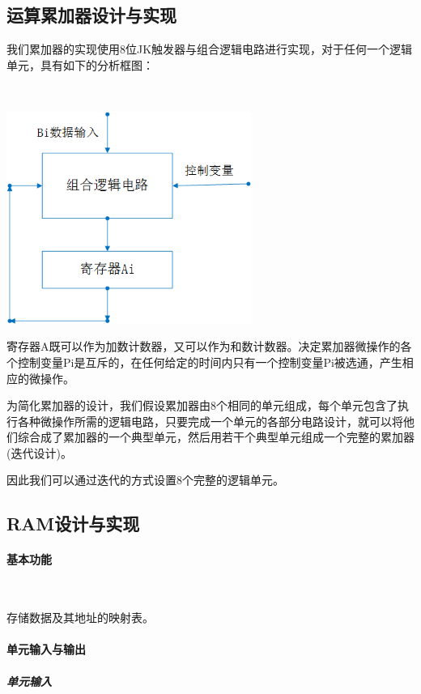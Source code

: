 \documentclass[UTF8]{ctexart}
\begin{document}
    \subsection{运算累加器设计与实现}
    我们累加器的实现使用8位JK触发器与组合逻辑电路进行实现，对于任何一个逻辑单元，具有如下的分析框图：

    ~

    \includegraphics[width=0.6\textwidth]{../img/累加器基本结构.png}

    寄存器A既可以作为加数计数器，又可以作为和数计数器。决定累加器微操作的各个控制变量Pi是互斥的，在任何给定的时间内只有一个控制变量Pi被选通，产生相应的微操作。

    为简化累加器的设计，我们假设累加器由8个相同的单元组成，每个单元包含了执行各种微操作所需的逻辑电路，只要完成一个单元的各部分电路设计，就可以将他们综合成了累加器的一个典型单元，然后用若干个典型单元组成一个完整的累加器(迭代设计)。

    因此我们可以通过迭代的方式设置8个完整的逻辑单元。

    \subsection{RAM设计与实现}
    \paragraph{基本功能}

    ~

    存储数据及其地址的映射表。

    \paragraph{单元输入与输出}

    \subparagraph{单元输入}

    ~
\end{document}

